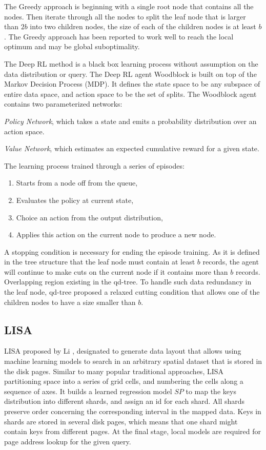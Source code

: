 The Greedy approach is beginning with a single root node that contains all the nodes. Then iterate through all the nodes to split the leaf node that is larger than $2b$ into two children nodes, the size of each of the children nodes is at least $b$. The Greedy approach has been reported \cite{Yang:2020ev} to work well to reach the local optimum and may be global suboptimality. 

The Deep RL method is a black box learning process without assumption on the data distribution or query. The Deep RL agent Woodblock is built on top of the Markov Decision Process (MDP). It defines the state space to be any subspace of entire data space, and action space to be the set of splits. The Woodblock agent contains two parameterized networks: 
\begin{enumerate*}
    \item \textit{Policy Network}, which takes a state and emits a probability distribution over an action space.
    \item \textit{Value Network}, which estimates an expected cumulative reward for a given state.
\end{enumerate*}
The learning process trained through a series of episodes: 
\begin{enumerate}
    \item Starts from a node off from the queue,
    \item Evaluates the policy at current state,
    \item Choice an action from the output distribution,
    \item Applies this action on the current node to produce a new node.
\end{enumerate}

A stopping condition is necessary for ending the episode training. As it is defined in the tree structure that the leaf node must contain at least $b$ records, the agent will continue to make cuts on the current node if it contains more than $b$ records. Overlapping region existing in the qd-tree. To handle such data redundancy in the leaf node, qd-tree proposed a relaxed cutting condition that allows one of the children nodes to have a size smaller than $b$.  


\subsection{LISA}
LISA proposed by Li \cite{Li:2020ki}, designated to generate data layout that allows using machine learning models to search in an arbitrary spatial dataset that is stored in the disk pages. Similar to many popular traditional approaches, LISA partitioning space into a series of grid cells, and numbering the cells along a sequence of axes. It builds a learned regression model $SP$ to map the keys distribution into different shards, and assign an id for each shard. All shards preserve order concerning the corresponding interval in the mapped data. Keys in shards are stored in several disk pages, which means that one shard might contain keys from different pages. At the final stage, local models are required for page address lookup for the given query. 

